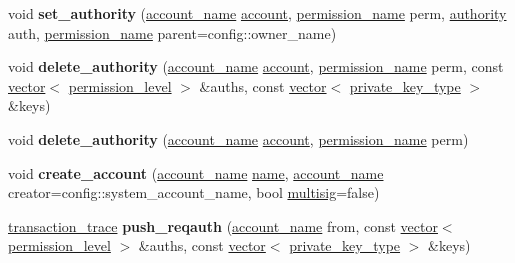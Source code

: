 \begin{DoxyCompactItemize}
void {\bfseries set\+\_\+authority} (\mbox{\hyperlink{structaacio_1_1chain_1_1name}{account\+\_\+name}} \mbox{\hyperlink{structaccount}{account}}, \mbox{\hyperlink{structaacio_1_1chain_1_1name}{permission\+\_\+name}} perm, \mbox{\hyperlink{structaacio_1_1chain_1_1authority}{authority}} auth, \mbox{\hyperlink{structaacio_1_1chain_1_1name}{permission\+\_\+name}} parent=config\+::owner\+\_\+name)
\item 
\mbox{\label{classaacio_1_1testing_1_1base__tester_a8986750028bef69ce620d40545c96b61}} 
void {\bfseries delete\+\_\+authority} (\mbox{\hyperlink{structaacio_1_1chain_1_1name}{account\+\_\+name}} \mbox{\hyperlink{structaccount}{account}}, \mbox{\hyperlink{structaacio_1_1chain_1_1name}{permission\+\_\+name}} perm, const \mbox{\hyperlink{classstd_1_1vector}{vector}}$<$ \mbox{\hyperlink{structaacio_1_1chain_1_1permission__level}{permission\+\_\+level}} $>$ \&auths, const \mbox{\hyperlink{classstd_1_1vector}{vector}}$<$ \mbox{\hyperlink{classfc_1_1crypto_1_1private__key}{private\+\_\+key\+\_\+type}} $>$ \&keys)
\item 
\mbox{\label{classaacio_1_1testing_1_1base__tester_ab23a5adc5d11fe8f2b9bc6fb8538c52f}} 
void {\bfseries delete\+\_\+authority} (\mbox{\hyperlink{structaacio_1_1chain_1_1name}{account\+\_\+name}} \mbox{\hyperlink{structaccount}{account}}, \mbox{\hyperlink{structaacio_1_1chain_1_1name}{permission\+\_\+name}} perm)
\item 
\mbox{\label{classaacio_1_1testing_1_1base__tester_a355e190237bf62eee1d073f44ff651a8}} 
void {\bfseries create\+\_\+account} (\mbox{\hyperlink{structaacio_1_1chain_1_1name}{account\+\_\+name}} \mbox{\hyperlink{structaacio_1_1chain_1_1name}{name}}, \mbox{\hyperlink{structaacio_1_1chain_1_1name}{account\+\_\+name}} creator=config\+::system\+\_\+account\+\_\+name, bool \mbox{\hyperlink{classaacio_1_1multisig}{multisig}}=false)
\item 
\mbox{\label{classaacio_1_1testing_1_1base__tester_a66b63791c7f57b55e55f10ba85397c8f}} 
\mbox{\hyperlink{structaacio_1_1chain_1_1transaction__trace}{transaction\+\_\+trace}} {\bfseries push\+\_\+reqauth} (\mbox{\hyperlink{structaacio_1_1chain_1_1name}{account\+\_\+name}} from, const \mbox{\hyperlink{classstd_1_1vector}{vector}}$<$ \mbox{\hyperlink{structaacio_1_1chain_1_1permission__level}{permission\+\_\+level}} $>$ \&auths, const \mbox{\hyperlink{classstd_1_1vector}{vector}}$<$ \mbox{\hyperlink{classfc_1_1crypto_1_1private__key}{private\+\_\+key\+\_\+type}} $>$ \&keys)

\end{DoxyCompactItemize}
